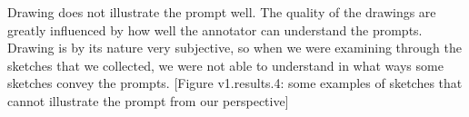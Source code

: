 Drawing does not illustrate the prompt well. The quality of the drawings are greatly influenced by how well the annotator can understand the prompts. Drawing is by its nature very subjective, so when we were examining through the sketches that we collected, we were not able to understand in what ways some sketches convey the prompts. 
[Figure v1.results.4: some examples of sketches that cannot illustrate the prompt from our perspective]

